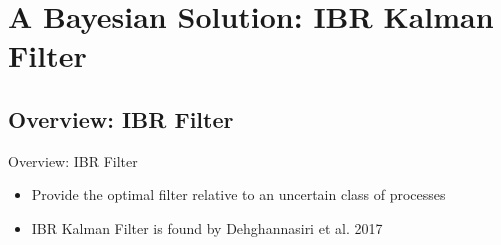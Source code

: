 \section{A Bayesian Solution: IBR Kalman Filter}

\subsection{Overview: IBR Filter}
\begin{frame}{Overview: IBR Filter}
\begin{itemize}
    \item Provide the optimal filter relative to an uncertain class of processes
    \item IBR Kalman Filter is found by Dehghannasiri et al. 2017
\end{itemize}     
\end{frame}